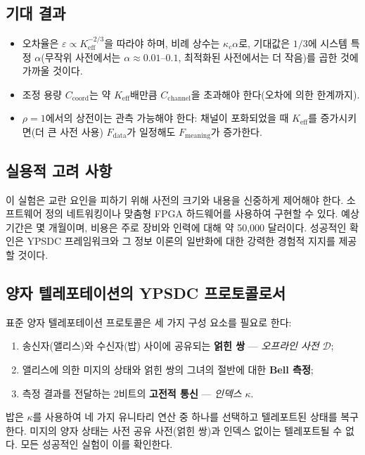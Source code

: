 \documentclass[12pt,a4paper]{article}
\newcommand{\Keff}{K_{\mathrm{eff}}}
\begin{document}
	\subsection{기대 결과}
	
	\begin{itemize}
		\item 오차율은 $\varepsilon \propto K_{\mathrm{eff}}^{-2/3}$을 따라야 하며, 비례 상수는 $\kappa_c \alpha$로, 기대값은 $1/3$에 시스템 특정 $\alpha$(무작위 사전에서는 $\alpha \approx 0.01$–$0.1$, 최적화된 사전에서는 더 작음)를 곱한 것에 가까울 것이다.
		\item 조정 용량 $C_{\text{coord}}$는 약 $\Keff$배만큼 $C_{\text{channel}}$을 초과해야 한다(오차에 의한 한계까지).
		\item $\rho=1$에서의 상전이는 관측 가능해야 한다: 채널이 포화되었을 때 $\Keff$를 증가시키면(더 큰 사전 사용) $F_{\text{data}}$가 일정해도 $F_{\text{meaning}}$가 증가한다.
	\end{itemize}
	
	\subsection{실용적 고려 사항}
	
	이 실험은 교란 요인을 피하기 위해 사전의 크기와 내용을 신중하게 제어해야 한다. 소프트웨어 정의 네트워킹이나 맞춤형 FPGA 하드웨어를 사용하여 구현할 수 있다. 예상 기간은 몇 개월이며, 비용은 주로 장비와 인력에 대해 약 50,000 달러이다. 성공적인 확인은 YPSDC 프레임워크와 그 정보 이론의 일반화에 대한 강력한 경험적 지지를 제공할 것이다.
	
	\subsection{양자 텔레포테이션의 YPSDC 프로토콜로서}
	\label{subsec:qt}
	
	표준 양자 텔레포테이션 프로토콜은 세 가지 구성 요소를 필요로 한다:
	\begin{enumerate}
		\item 송신자(앨리스)와 수신자(밥) 사이에 공유되는 \textbf{얽힌 쌍} — \emph{오프라인 사전} $\mathcal{D}$;
		\item 앨리스에 의한 미지의 상태와 얽힌 쌍의 그녀의 절반에 대한 \textbf{Bell 측정};
		\item 측정 결과를 전달하는 2비트의 \textbf{고전적 통신} — \emph{인덱스} $\kappa$.
	\end{enumerate}
	밥은 $\kappa$를 사용하여 네 가지 유니타리 연산 중 하나를 선택하고 텔레포트된 상태를 복구한다. 미지의 양자 상태는 사전 공유 사전(얽힌 쌍)과 인덱스 없이는 텔레포트될 수 없다. 모든 성공적인 실험이 이를 확인한다.
	
\end{document}
